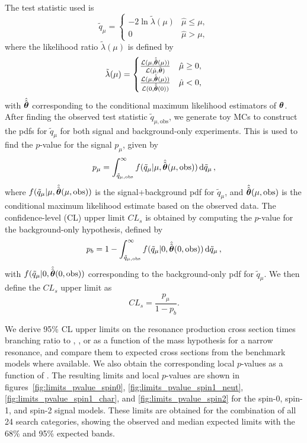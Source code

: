 The test statistic used is
\begin{equation}
  \tilde{q}_\mu=\begin{cases}
    -2\ln\tilde{\lambda}(\mu) & \hat{\mu}\leq\mu,\\
    0 & \hat{\mu}>\mu,
  \end{cases}
\end{equation}
where the likelihood ratio $\tilde{\lambda}(\mu)$ is defined by
\begin{equation}
  \tilde{\lambda}(\mu)=\begin{cases}
    \frac{\mathcal{L}(\mu,\hat{\hat{\vb*{\theta}}}(\mu))}{\mathcal{L}(\hat{\mu},\hat{\vb*{\theta}})} & \hat{\mu}\geq0,\\
    \frac{\mathcal{L}(\mu,\hat{\hat{\vb*{\theta}}}(\mu))}{\mathcal{L}(0,\hat{\hat{\vb*{\theta}}}(0))} & \hat{\mu}<0,
  \end{cases}
\end{equation}
with $\hat{\hat{\vb*{\theta}}}$ corresponding to the conditional maximum likelihood estimators of $\vb*{\theta}$.
After finding the observed test statistic $\tilde{q}_{\mu,\mathrm{obs}}$, we generate toy MCs to construct the pdfs for $\tilde{q}_\mu$ for both signal and background-only experiments.
This is used to find the $p$-value for the signal $p_\mu$, given by
\begin{equation}
  p_\mu=\int_{\tilde{q}_{\mu,\mathrm{obs}}}^\infty f(\tilde{q}_\mu|\mu,\hat{\hat{\vb*{\theta}}}(\mu,\mathrm{obs}))\dd{\tilde{q}_\mu},
\end{equation}
where $f(\tilde{q}_\mu|\mu,\hat{\hat{\vb*{\theta}}}(\mu,\mathrm{obs}))$ is the signal+background pdf for $\tilde{q}_\mu$, and $\hat{\hat{\vb*{\theta}}}(\mu,\mathrm{obs})$ is the conditional maximum likelihood estimate based on the observed data.
The confidence-level (CL) upper limit $CL_s$ is obtained by computing the $p$-value for the background-only hypothesis, defined by
\begin{equation}
  p_b=1-\int_{\tilde{q}_{\mu,\mathrm{obs}}}^\infty f(\tilde{q}_\mu|0,\hat{\hat{\vb*{\theta}}}(0,\mathrm{obs}))\dd{\tilde{q}_\mu},
\end{equation}
with $f(\tilde{q}_\mu|0,\hat{\hat{\vb*{\theta}}}(0,\mathrm{obs}))$ corresponding to the background-only pdf for $\tilde{q}_\mu$.
We then define the $CL_s$ upper limit as
\begin{equation}
  CL_s=\frac{p_\mu}{1-p_b}.
\end{equation}

We derive 95\% CL upper limits on the resonance production cross section times branching ratio to \WW, \WZ, or \WH as a function of the mass hypothesis \MX for a narrow resonance, and compare them to expected cross sections from the benchmark models where available.
We also obtain the corresponding local $p$-values as a function of \MX.
The resulting limits and local $p$-values are shown in figures~\ref{fig:limits_pvalue_spin0}, \ref{fig:limits_pvalue_spin1_neut}, \ref{fig:limits_pvalue_spin1_char}, and \ref{fig:limits_pvalue_spin2} for the spin-0, spin-1, and spin-2 signal models.
These limits are obtained for the combination of all 24 search categories, showing the observed and median expected limits with the 68\% and 95\% expected bands.

